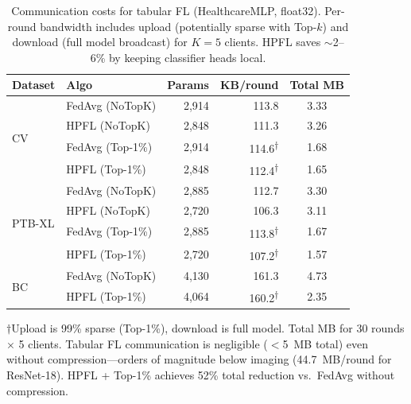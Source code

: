 \documentclass[conference]{IEEEtran}
\begin{document}

\begin{table}[htbp]
\centering
\caption{Communication costs for tabular FL (HealthcareMLP, float32). Per-round bandwidth includes upload (potentially sparse with Top-$k$) and download (full model broadcast) for $K{=}5$ clients. HPFL saves $\sim$2--6\% by keeping classifier heads local.}
\label{tab:comm_costs}
\small
\begin{tabular}{llrrc}
\toprule
\textbf{Dataset} & \textbf{Algo} & \textbf{Params} & \textbf{KB/round} & \textbf{Total MB} \\
\midrule
\multirow{4}{*}{CV} & FedAvg (NoTopK) & 2,914 & 113.8 & 3.33 \\
 & HPFL (NoTopK) & 2,848 & 111.3 & 3.26 \\
 & FedAvg (Top-1\%) & 2,914 & 114.6\textsuperscript{$\dagger$} & 1.68 \\
 & HPFL (Top-1\%) & 2,848 & 112.4\textsuperscript{$\dagger$} & 1.65 \\
\midrule
\multirow{4}{*}{PTB-XL} & FedAvg (NoTopK) & 2,885 & 112.7 & 3.30 \\
 & HPFL (NoTopK) & 2,720 & 106.3 & 3.11 \\
 & FedAvg (Top-1\%) & 2,885 & 113.8\textsuperscript{$\dagger$} & 1.67 \\
 & HPFL (Top-1\%) & 2,720 & 107.2\textsuperscript{$\dagger$} & 1.57 \\
\midrule
\multirow{2}{*}{BC} & FedAvg (NoTopK) & 4,130 & 161.3 & 4.73 \\
 & HPFL (Top-1\%) & 4,064 & 160.2\textsuperscript{$\dagger$} & 2.35 \\
\bottomrule
\end{tabular}

\vspace{1mm}
\footnotesize{$\dagger$Upload is 99\% sparse (Top-1\%), download is full model. Total MB for 30 rounds $\times$ 5 clients. Tabular FL communication is negligible ($<$5~MB total) even without compression---orders of magnitude below imaging (44.7~MB/round for ResNet-18). HPFL + Top-1\% achieves 52\% total reduction vs.\ FedAvg without compression.}
\end{table}

\end{document}
